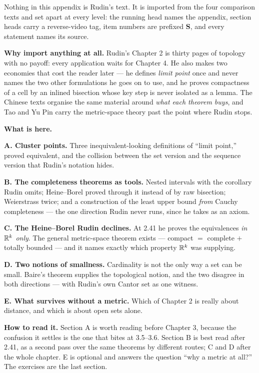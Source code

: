 
\begin{roadmap}
Nothing in this appendix is Rudin's text. It is imported from the four
comparison texts and set apart at every level: the running head names the
appendix, section heads carry a reverse-video tag, item numbers are prefixed
\textbf{S}, and every statement names its source.

\medskip
\raggedright
\textbf{Why import anything at all.} Rudin's Chapter 2 is thirty pages of
topology with no payoff: every application waits for Chapter 4. He also makes
two economies that cost the reader later --- he defines \emph{limit point}
once and never names the two other formulations he goes on to use, and he
proves compactness of a cell by an inlined bisection whose key step is never
isolated as a lemma. The Chinese texts organise the same material around
\emph{what each theorem buys}, and Tao and Yu Pin carry the metric-space
theory past the point where Rudin stops.

\medskip
\textbf{What is here.}

\smallskip
\textbf{A. Cluster points.} Three inequivalent-looking definitions of ``limit
point,'' proved equivalent, and the collision between the set version and the
sequence version that Rudin's notation hides.

\medskip
\textbf{B. The completeness theorems as tools.} Nested intervals with the
corollary Rudin omits; Heine--Borel proved through it instead of by raw
bisection; Weierstrass twice; and a construction of the least upper bound
\emph{from} Cauchy completeness --- the one direction Rudin never runs,
since he takes \lub{} as an axiom.

\medskip
\textbf{C. The Heine--Borel Rudin declines.} At 2.41 he proves the
equivalences \emph{in $\mathbb{R}^k$ only}. The general metric-space theorem exists
--- compact $=$ complete $+$ totally bounded --- and it names exactly which
property $\mathbb{R}^k$ was supplying.

\medskip
\textbf{D. Two notions of smallness.} Cardinality is not the only way a set
can be small. Baire's theorem supplies the topological notion, and the two
disagree in both directions --- with Rudin's own Cantor set as one witness.

\medskip
\textbf{E. What survives without a metric.} Which of Chapter 2 is really
about distance, and which is about open sets alone.

\medskip
\textbf{How to read it.} Section A is worth reading before Chapter 3, because
the confusion it settles is the one that bites at 3.5--3.6. Section B is best
read after 2.41, as a second pass over the same theorems by different routes;
C and D after the whole chapter. E is optional and answers the question
``why a metric at all?'' The exercises are the last section.
\end{roadmap}

